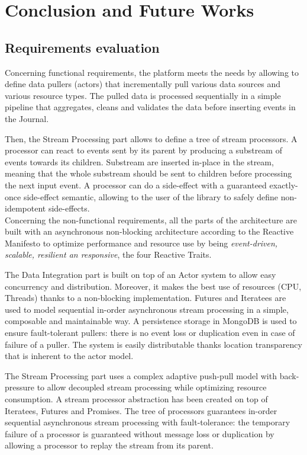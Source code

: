 \chapter{Conclusion and Future Works}

\section{Requirements evaluation}

Concerning functional requirements, the platform meets the needs by allowing to define data pullers (actors) that incrementally pull various data sources and various resource types.
The pulled data is processed sequentially in a simple pipeline that aggregates, cleans and validates the data before inserting events in the Journal.

Then, the Stream Processing part allows to define a tree of stream processors. A processor can react to events sent by its parent by producing a substream of events towards its children. Substream are inserted in-place in the stream, meaning that the whole substream should be sent to children before processing the next input event. A processor can do a side-effect with a guaranteed exactly-once side-effect semantic, allowing to the user of the library to safely define non-idempotent side-effects.
\\

Concerning the non-functional requirements, all the parts of the architecture are built with an asynchronous non-blocking architecture according to the Reactive Manifesto 
 to optimize performance and resource use by being \textit{event-driven, scalable, resilient an responsive}, the four Reactive Traits.

The Data Integration part is built on top of an Actor system to allow easy concurrency and distribution. Moreover, it makes the best use of resources (CPU, Threads) thanks to a non-blocking implementation. Futures and Iteratees are used to model sequential in-order asynchronous stream processing in a simple, composable and maintainable way. A persistence storage
in MongoDB is used to ensure fault-tolerant pullers: there is no event loss or duplication even in case of failure of a puller. The system is easily distributable 
thanks location transparency that is inherent to the actor model.

The Stream Processing part uses a complex adaptive push-pull model with back-pressure to allow decoupled stream processing while optimizing resource consumption. A stream processor abstraction has been created on top of Iteratees, Futures and Promises. The tree of processors guarantees in-order sequential asynchronous stream processing with fault-tolerance: the temporary failure of a processor is guaranteed without message loss or duplication by allowing a processor to replay the stream from its parent.
\\


